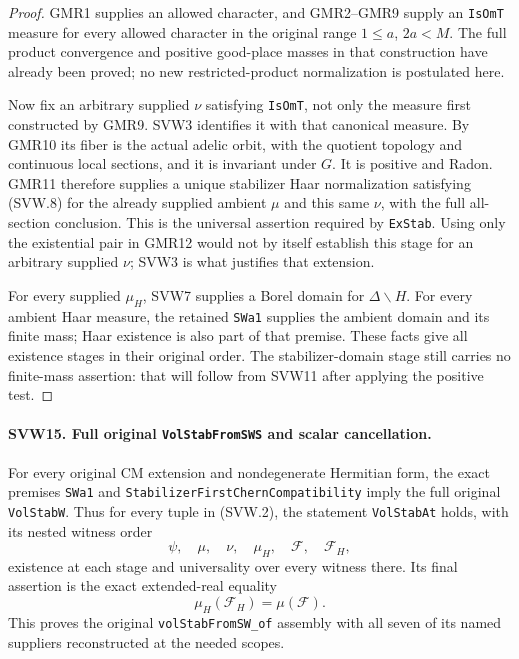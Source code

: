 \documentclass[11pt,a4paper]{article}
\numberwithin{equation}{section}
\theoremstyle{remark}\newtheorem{remark}[theorem]{Remark}
\begin{document}
\begin{proof}
GMR1 supplies an allowed character, and GMR2--GMR9 supply an
\texttt{Is\allowbreak Om\allowbreak T} measure for every allowed character in the original
range $1\leq a$, $2a<M$.  The full product convergence and positive
good-place masses in that construction have already been proved;
no new restricted-product normalization is postulated here.

Now fix an arbitrary supplied $\nu$ satisfying \texttt{Is\allowbreak Om\allowbreak T},
not only the measure first constructed by GMR9.  SVW3 identifies
it with that canonical measure.  By GMR10 its fiber is the actual
adelic orbit, with the quotient topology and continuous local
sections, and it is invariant under $G$.  It is positive and
Radon.  GMR11 therefore supplies a unique stabilizer Haar
normalization satisfying (SVW.8) for the already supplied ambient
$\mu$ and this same $\nu$, with the full all-section conclusion.
This is the universal assertion required by \texttt{Ex\allowbreak Stab}.
Using only the existential pair in GMR12 would not by itself
establish this stage for an arbitrary supplied $\nu$; SVW3 is what
justifies that extension.

For every supplied $\mu_H$, SVW7 supplies a Borel domain for
$\Delta\backslash H$.  For every ambient Haar measure, the
retained \texttt{SWa1} supplies the ambient domain and its finite
mass; Haar existence is also part of that premise.  These facts
give all existence stages in their original order.  The
stabilizer-domain stage still carries no finite-mass assertion:
that will follow from SVW11 after applying the positive test.
\end{proof}

\paragraph{SVW15. Full original \texttt{Vol\allowbreak Stab\allowbreak From\allowbreak SWS} and scalar cancellation.}
\label{claim:SVW15}
For every original CM extension and nondegenerate Hermitian form,
the exact premises \texttt{SWa1} and
\texttt{Stabilizer\allowbreak First\allowbreak Chern}\allowbreak\texttt{Compatibility} imply the full original
\texttt{Vol\allowbreak Stab\allowbreak W}.  Thus for every tuple in (SVW.2), the statement
\texttt{Vol\allowbreak Stab\allowbreak At} holds, with its nested witness order
\[
 \psi,\quad\mu,\quad\nu,\quad\mu_H,\quad
                       \mathcal F,\quad\mathcal F_H,
 \tag{SVW.28}
\]
existence at each stage and universality over every witness there.
Its final assertion is the exact extended-real equality
\[
                         \mu_H(\mathcal F_H)=\mu(\mathcal F).
 \tag{SVW.29}
\]
This proves the original \texttt{vol\allowbreak Stab\allowbreak From\allowbreak SW\_\allowbreak of} assembly with
all seven of its named suppliers reconstructed at the needed scopes.
\end{document}
